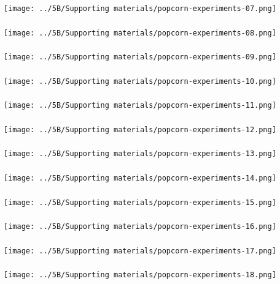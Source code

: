 \begin{frame}\frametitle{}
	\centerline{\texttt{[image: ../5B/Supporting materials/popcorn-experiments-07.png]}}
\end{frame}
\begin{frame}\frametitle{}
	\centerline{\texttt{[image: ../5B/Supporting materials/popcorn-experiments-08.png]}}
\end{frame}
\begin{frame}\frametitle{}
	\centerline{\texttt{[image: ../5B/Supporting materials/popcorn-experiments-09.png]}}
\end{frame}
\begin{frame}\frametitle{}
	\centerline{\texttt{[image: ../5B/Supporting materials/popcorn-experiments-10.png]}}
\end{frame}
\begin{frame}\frametitle{}
	\centerline{\texttt{[image: ../5B/Supporting materials/popcorn-experiments-11.png]}}
\end{frame}
\begin{frame}\frametitle{}
	\centerline{\texttt{[image: ../5B/Supporting materials/popcorn-experiments-12.png]}}
\end{frame}
\begin{frame}\frametitle{}
	\centerline{\texttt{[image: ../5B/Supporting materials/popcorn-experiments-13.png]}}
\end{frame}
\begin{frame}\frametitle{}
	\centerline{\texttt{[image: ../5B/Supporting materials/popcorn-experiments-14.png]}}
\end{frame}
\begin{frame}\frametitle{}
	\centerline{\texttt{[image: ../5B/Supporting materials/popcorn-experiments-15.png]}}
\end{frame}
\begin{frame}\frametitle{}
	\centerline{\texttt{[image: ../5B/Supporting materials/popcorn-experiments-16.png]}}
\end{frame}
\begin{frame}\frametitle{}
	\centerline{\texttt{[image: ../5B/Supporting materials/popcorn-experiments-17.png]}}
\end{frame}
\begin{frame}\frametitle{}
	\centerline{\texttt{[image: ../5B/Supporting materials/popcorn-experiments-18.png]}}
\end{frame}
